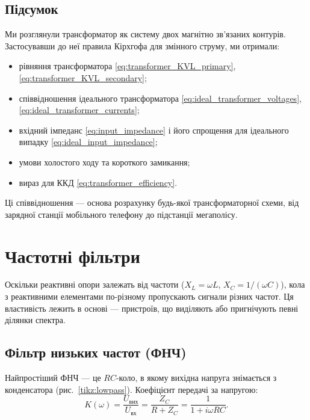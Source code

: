 \subsection*{Підсумок}

Ми розглянули трансформатор як систему двох магнітно
зв'язаних контурів. Застосувавши до неї правила Кірхгофа для
змінного струму, ми отримали:
\begin{itemize}
	\item рівняння трансформатора \eqref{eq:transformer_KVL_primary},
	\eqref{eq:transformer_KVL_secondary};
	\item співвідношення ідеального трансформатора
	\eqref{eq:ideal_transformer_voltages},
	\eqref{eq:ideal_transformer_currents};
	\item вхідний імпеданс \eqref{eq:input_impedance} і його
	спрощення для ідеального випадку
	\eqref{eq:ideal_input_impedance};
	\item умови холостого ходу та короткого замикання;
	\item вираз для ККД \eqref{eq:transformer_efficiency}.
\end{itemize}
Ці співвідношення --- основа розрахунку будь-якої
трансформаторної схеми, від зарядної станції мобільного
телефону до підстанції мегаполісу.

\section{Частотні фільтри}\hypertarget{frequency-filters}{}

Оскільки реактивні опори залежать від частоти ($X_L = \omega L$, $X_C = 1/(\omega C)$), кола з реактивними елементами по-різному пропускають сигнали різних частот. Ця властивість лежить в основі  --- пристроїв, що виділяють або пригнічують певні ділянки спектра.

\subsection*{Фільтр низьких частот (ФНЧ)}

Найпростіший ФНЧ --- це $RC$-коло, в якому вихідна напруга знімається з конденсатора (рис.~\ref{tikz:lowpass}). Коефіцієнт передачі за напругою:
\begin{equation}\label{eq:lowpass_transfer}
	K(\omega) = \frac{U_{\text{вих}}}{U_{\text{вх}}}
	          = \frac{Z_C}{R + Z_C}
	          = \frac{1}{1 + i\omega RC}.
\end{equation}

